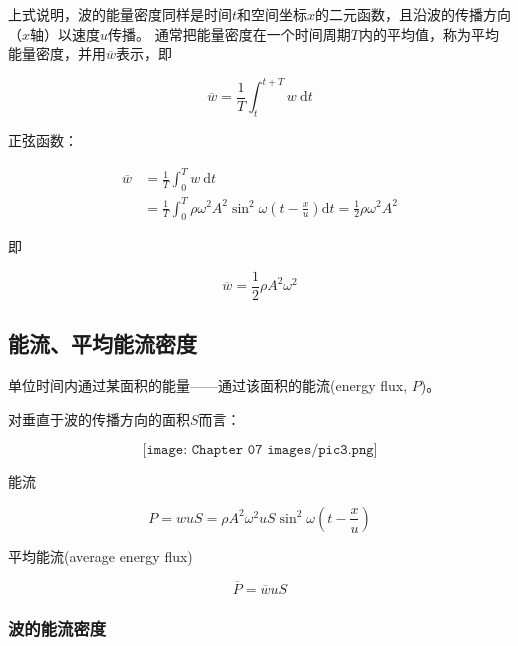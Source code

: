 \documentclass[
	12pt, %
	a4paper, %
]{myLegrandOrangeBook}
\begin{document}
    上式说明，波的能量密度同样是时间\(t\)和空间坐标\(x\)的二元函数，且沿波的传播方向（\(x\)轴）以速度\(u\)传播。
    通常把能量密度在一个时间周期\(T\)内的平均值，称为平均能量密度，并用\(\overline{w}\)表示，即

    \begin{equation}
        \overline{w}=\frac{1}{T} \int_t^{t+T} w \mathrm{~d} t
    \end{equation}

    正弦函数：

    $$
        \begin{aligned}
            \overline{w} & =\frac{1}{T} \int_0^T w \mathrm{~d} t \\
            & =\frac{1}{T} \int_0^T \rho \omega^2 A^2 \sin ^2 \omega\left(t-\frac{x}{u}\right) \mathrm{d} t=\frac{1}{2} \rho \omega^2 A^2
        \end{aligned}
    $$

    即

    \begin{equation}
        \overline{w}=\frac{1}{2} \rho A^2 \omega^2
    \end{equation}

\subsection{能流、平均能流密度}

\begin{definition}[能流（面能量）]
    单位时间内通过某面积的能量——通过该面积的能流(energy flux, \(P\))。
\end{definition}

    对垂直于波的传播方向的面积\(S\)而言：

    \[
        \texttt{[image: Chapter 07 images/pic3.png]}
    \]

    能流

    \begin{equation}
        P=w u S=\rho A^2 \omega^2 u S \sin ^2 \omega\left(t-\frac{x}{u}\right)
    \end{equation}

    平均能流(average energy flux)

    \begin{equation}
        \overline{P}=\overline{w} u S
    \end{equation}

\subsubsection{波的能流密度}
\end{document}
